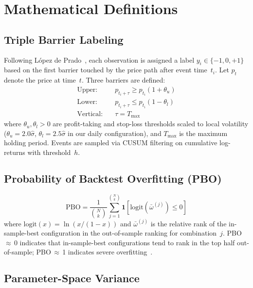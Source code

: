 \documentclass[sigconf,anonymous,review]{acmart}
\begin{document}
\section{Mathematical Definitions}
\label{app:math}

\subsection{Triple Barrier Labeling}

Following L\'{o}pez de Prado~\cite{lopezdeprado2018advances}, each
observation is assigned a label $y_i \in \{-1, 0, +1\}$ based on
the first barrier touched by the price path after event time~$t_i$.
Let $p_t$ denote the price at time~$t$. Three barriers are defined:
\begin{align}
\text{Upper:} \quad & p_{t_i + \tau} \geq p_{t_i}(1 + \theta_u) \\
\text{Lower:} \quad & p_{t_i + \tau} \leq p_{t_i}(1 - \theta_l) \\
\text{Vertical:} \quad & \tau = T_{\max}
\end{align}
where $\theta_u, \theta_l > 0$ are profit-taking and stop-loss
thresholds scaled to local volatility
($\theta_u = 2.0\hat{\sigma}$, $\theta_l = 2.5\hat{\sigma}$ in
our daily configuration), and $T_{\max}$ is the maximum holding
period. Events are sampled via CUSUM filtering on cumulative
log-returns with threshold~$h$.

\subsection{Probability of Backtest Overfitting (PBO)}

\begin{equation}
\mathrm{PBO} = \frac{1}{\binom{N}{k}}
\sum_{j=1}^{\binom{N}{k}}
\mathbf{1}\!\left[\mathrm{logit}(\bar{\omega}^{(j)}) \leq 0\right]
\end{equation}
where $\mathrm{logit}(x) = \ln(x / (1-x))$ and $\bar{\omega}^{(j)}$
is the relative rank of the in-sample-best configuration in the
out-of-sample ranking for combination~$j$. PBO\,$\approx$\,0
indicates that in-sample-best configurations tend to rank in the
top half out-of-sample; PBO\,$\approx$\,1 indicates severe
overfitting~\cite{bailey2017pbo}.

\subsection{Parameter-Space Variance}
\end{document}
